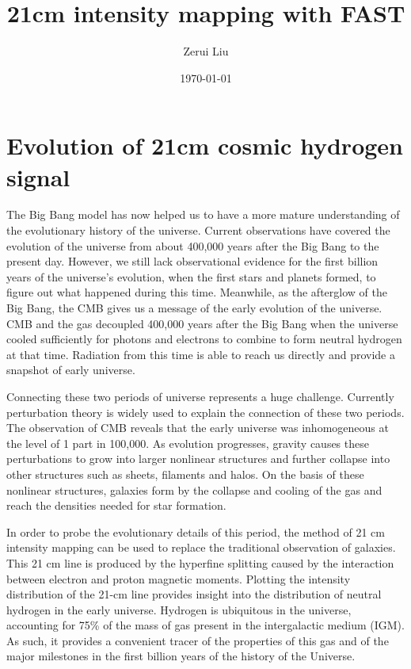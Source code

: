 \documentclass{article}
\title{21cm intensity mapping with FAST}
\author{Zerui Liu}
\date{\today}
\begin{document}
\maketitle
\tableofcontents
\section{Evolution of 21cm cosmic hydrogen signal}
The Big Bang model has now helped us to have a more mature understanding of the evolutionary history of the universe. Current observations have covered the evolution of the universe from about 400,000 years after the Big Bang to the present day. However, we still lack observational evidence for the first billion years of the universe's evolution, when the first stars and planets formed, to figure out what happened during this time. Meanwhile, as the afterglow of the Big Bang, the CMB gives us a message of the early evolution of the universe. CMB and the gas decoupled 400,000 years after the Big Bang when the universe cooled sufficiently for photons and electrons to combine to form neutral hydrogen at that time. Radiation from this time is able to reach us directly and provide a snapshot of early universe.

Connecting these two periods of universe represents a huge challenge. Currently perturbation theory is widely used to explain the connection of these two periods. The observation of CMB reveals that the early universe was inhomogeneous at the level of 1 part in 100,000. As evolution progresses, gravity causes these perturbations to grow into larger nonlinear structures and further collapse into other structures such as sheets, filaments and halos. On the basis of these nonlinear structures, galaxies form by the collapse and cooling of the gas and reach the densities needed for star formation.

In order to probe the evolutionary details of this period, the method of 21 cm intensity mapping can be used to replace the traditional observation of galaxies. This 21 cm line is produced by the hyperfine splitting caused by the interaction between electron and proton magnetic moments. Plotting the intensity distribution of the 21-cm line provides insight into the distribution of neutral hydrogen in the early universe. Hydrogen is ubiquitous in the universe, accounting for 75\% of the mass of gas present in the intergalactic medium (IGM). As such, it provides a convenient tracer of the properties of this gas and of the major milestones in the first billion years of the history of the Universe.
\end{document}

